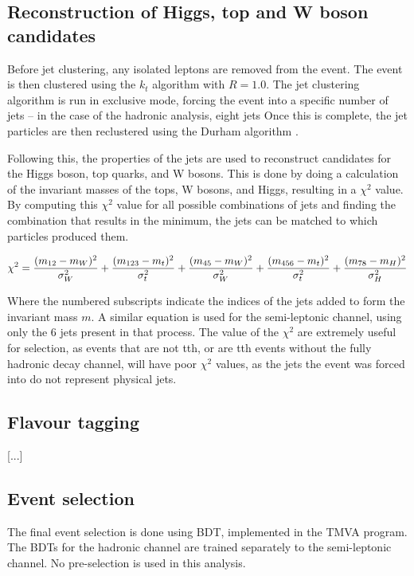 \subsection{Reconstruction of Higgs, top and W boson candidates}
Before jet clustering, any isolated leptons are removed from the event. The event is then clustered using the $k_t$ algorithm with $R = 1.0$. The jet clustering algorithm is run in exclusive mode, forcing the event into a specific number of jets -- in  the case of the hadronic analysis, eight jets Once this is complete, the jet particles are then reclustered using the Durham algorithm .

Following this, the properties of the jets are used to reconstruct candidates for the Higgs boson, top quarks, and W bosons. This is done by doing a calculation of the invariant masses of the tops, W bosons, and Higgs, resulting in a $\chi^2$ value. By computing this $\chi^2$ value for all possible combinations of jets and finding the combination that results in the minimum, the jets can be matched to which particles produced them. 

\begin{equation}
  \centering
	\chi^2 = \frac{(m_{12} - m_W)^2}{\sigma^2_W} + \frac{(m_{123} - m_t)^2}{\sigma^2_{t}} + \frac{(m_{45} - m_W)^2}{\sigma^2_W} + \frac{(m_{456} - m_t)^2}{\sigma^2_{t}} + \frac{(m_{78} - m_H)^2}{\sigma^2_H}
\label{eq:chi-square}
\end{equation}

Where the numbered subscripts indicate the indices of the jets added to form the invariant mass $m$. A similar equation is used for the semi-leptonic channel, using only the 6 jets present in that process. The value of the $\chi^2$ are extremely useful for selection, as events that are not tth, or are tth events without the fully hadronic decay channel, will have poor $\chi^2$ values, as the jets the event was forced into do not represent physical jets.

\subsection{Flavour tagging}
[...]

\subsection{Event selection}
The final event selection is done using \acrfull{BDT}, implemented in the \acrfull{TMVA} program. The \acrshort{BDT}s for the hadronic channel are trained separately to the semi-leptonic channel. No pre-selection is used in this analysis.

